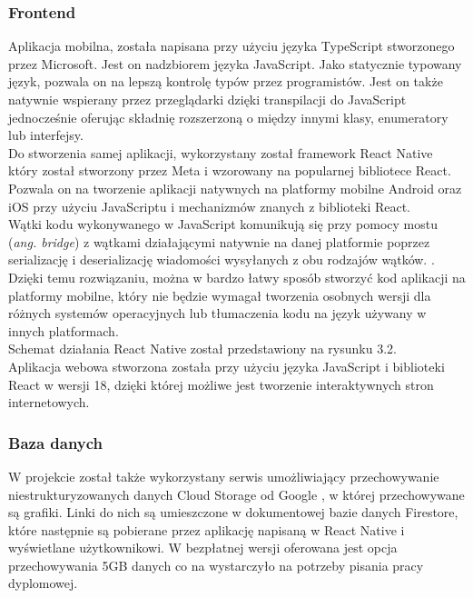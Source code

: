     \subsubsection{Frontend}
    Aplikacja mobilna, została napisana przy użyciu języka TypeScript \cite{TypeScript} stworzonego przez Microsoft. Jest on nadzbiorem języka JavaScript. Jako statycznie typowany język, pozwala on na lepszą kontrolę typów przez programistów. Jest on także natywnie wspierany przez przeglądarki dzięki transpilacji do JavaScript jednocześnie oferując składnię rozszerzoną o między innymi klasy, enumeratory lub interfejsy. \\
    Do stworzenia samej aplikacji, wykorzystany został framework React Native \cite{ReactNative} który został stworzony przez Meta i wzorowany na popularnej bibliotece React. Pozwala on na tworzenie aplikacji natywnych na platformy mobilne Android oraz iOS przy użyciu JavaScriptu i mechanizmów znanych z biblioteki React. \\
    Wątki kodu wykonywanego w JavaScript komunikują się przy pomocy mostu (\textit{ang. bridge}) z wątkami działającymi natywnie na danej platformie poprzez serializację i deserializację wiadomości wysyłanych z obu rodzajów wątków. \cite{ReactNativeMedium} \cite{ReactNativeNetguru}.
    Dzięki temu rozwiązaniu, można w bardzo łatwy sposób stworzyć kod aplikacji na platformy mobilne, który nie będzie wymagał tworzenia osobnych wersji dla różnych systemów operacyjnych lub tłumaczenia kodu na język używany w innych platformach. \\
    Schemat działania React Native został przedstawiony na rysunku 3.2. \\

    Aplikacja webowa stworzona została przy użyciu języka JavaScript i biblioteki React w wersji 18, dzięki której możliwe jest tworzenie interaktywnych stron internetowych.

    \subsubsection{Baza danych}
    W projekcie został także wykorzystany serwis umożliwiający przechowywanie niestrukturyzowanych danych Cloud Storage od Google \cite{CloudStorage}, w której przechowywane są grafiki. Linki do nich są umieszczone w dokumentowej bazie danych Firestore, które następnie są pobierane przez aplikację napisaną w React Native i wyświetlane użytkownikowi. W bezpłatnej wersji oferowana jest opcja przechowywania 5GB danych co na wystarczyło na potrzeby pisania pracy dyplomowej. \\

